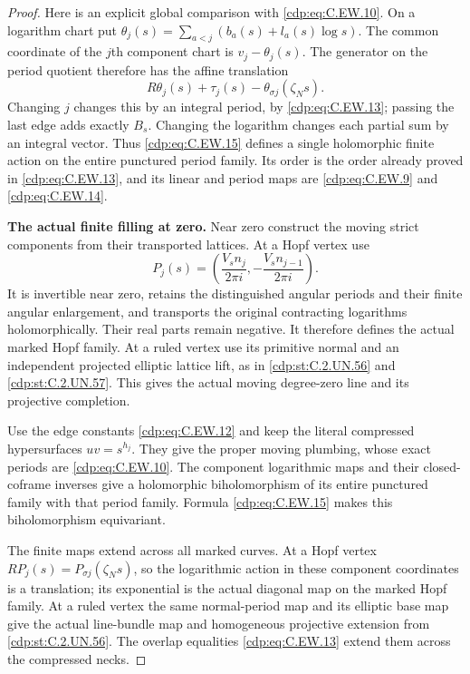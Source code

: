 \begin{proof}
Here is an explicit global comparison with \eqref{cdp:eq:C.EW.10}.
On a logarithm chart put
$\theta_j(s)=\sum_{a<j}(b_a(s)+l_a(s)\log s)$.
The common coordinate of the $j$th component chart is
$v_j-\theta_j(s)$. The generator on the period quotient
therefore has the affine translation
\[
 R\theta_j(s)+\tau_j(s)-\theta_{\sigma j}(\zeta_Ns).
\tag{C.EW.15}\label{cdp:eq:C.EW.15}
\]
Changing $j$ changes this by an integral period, by
\eqref{cdp:eq:C.EW.13}; passing the last edge adds exactly $B_s$.
Changing the logarithm changes each partial sum by
an integral vector. Thus \eqref{cdp:eq:C.EW.15} defines a single
holomorphic finite action on the entire punctured
period family. Its order is the order already proved
in \eqref{cdp:eq:C.EW.13}, and its linear and period maps are
\eqref{cdp:eq:C.EW.9} and \eqref{cdp:eq:C.EW.14}.

\par\medskip\noindent\textbf{The actual finite filling at zero.}
Near zero construct the moving strict components from
their transported lattices. At a Hopf vertex use
\[
 P_j(s)=\left(\frac{V_s n_j}{2\pi i},
                        -\frac{V_s n_{j-1}}{2\pi i}\right).
\tag{C.EW.16}\label{cdp:eq:C.EW.16}
\]
It is invertible near zero, retains the distinguished
angular periods and their finite angular enlargement,
and transports the original contracting logarithms
holomorphically. Their real parts remain negative.
It therefore defines the actual marked Hopf family.
At a ruled vertex use its primitive normal and an
independent projected elliptic lattice lift, as in
\ref{cdp:st:C.2.UN.56} and \ref{cdp:st:C.2.UN.57}. This gives the actual moving
degree-zero line and its projective completion.

Use the edge constants \eqref{cdp:eq:C.EW.12} and keep the literal
compressed hypersurfaces $uv=s^{h_j}$. They give the
proper moving plumbing, whose exact periods are
\eqref{cdp:eq:C.EW.10}. The component logarithmic maps and their
closed-coframe inverses give a holomorphic
biholomorphism of its entire punctured family with
that period family. Formula \eqref{cdp:eq:C.EW.15} makes this
biholomorphism equivariant.

The finite maps extend across all marked curves.
At a Hopf vertex
$RP_j(s)=P_{\sigma j}(\zeta_Ns)$, so the logarithmic
action in these component coordinates is a translation;
its exponential is the actual diagonal map on the
marked Hopf family. At a ruled vertex the same
normal-period map and its elliptic base map give the
actual line-bundle map and homogeneous projective
extension from \ref{cdp:st:C.2.UN.56}. The overlap equalities
\eqref{cdp:eq:C.EW.13} extend them across the compressed necks.


\end{proof}
